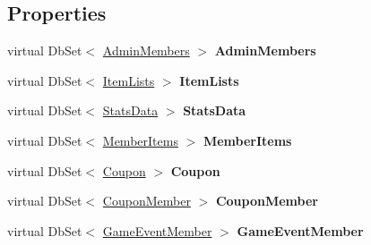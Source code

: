 \subsection*{Properties}
\begin{DoxyCompactItemize}
\item 
virtual Db\+Set$<$ \hyperlink{a00012}{Admin\+Members} $>$ {\bfseries Admin\+Members}\hypertarget{a00065_adbbfd5b92d30b2fb24d618435ce9a9b9}{}\label{a00065_adbbfd5b92d30b2fb24d618435ce9a9b9}

\item 
virtual Db\+Set$<$ \hyperlink{a00127}{Item\+Lists} $>$ {\bfseries Item\+Lists}\hypertarget{a00065_aee0437c77e1b4c5961f5811281234b66}{}\label{a00065_aee0437c77e1b4c5961f5811281234b66}

\item 
virtual Db\+Set$<$ \hyperlink{a00185}{Stats\+Data} $>$ {\bfseries Stats\+Data}\hypertarget{a00065_a03c5e7ad00f935aecbd55470b199b225}{}\label{a00065_a03c5e7ad00f935aecbd55470b199b225}

\item 
virtual Db\+Set$<$ \hyperlink{a00143}{Member\+Items} $>$ {\bfseries Member\+Items}\hypertarget{a00065_a26806075e48f05eca9fdcb38c9c6e6aa}{}\label{a00065_a26806075e48f05eca9fdcb38c9c6e6aa}

\item 
virtual Db\+Set$<$ \hyperlink{a00068}{Coupon} $>$ {\bfseries Coupon}\hypertarget{a00065_a4229fde1faf3b715b44f3e9925b2efc2}{}\label{a00065_a4229fde1faf3b715b44f3e9925b2efc2}

\item 
virtual Db\+Set$<$ \hyperlink{a00069}{Coupon\+Member} $>$ {\bfseries Coupon\+Member}\hypertarget{a00065_aeddd37d96d7580196dfdcb5ebe3bbf2e}{}\label{a00065_aeddd37d96d7580196dfdcb5ebe3bbf2e}

\item 
virtual Db\+Set$<$ \hyperlink{a00081}{Game\+Event\+Member} $>$ {\bfseries Game\+Event\+Member}\hypertarget{a00065_afc122a11fdc5c4f293e730742d29a64c}{}\label{a00065_afc122a11fdc5c4f293e730742d29a64c}


\end{DoxyCompactItemize}
